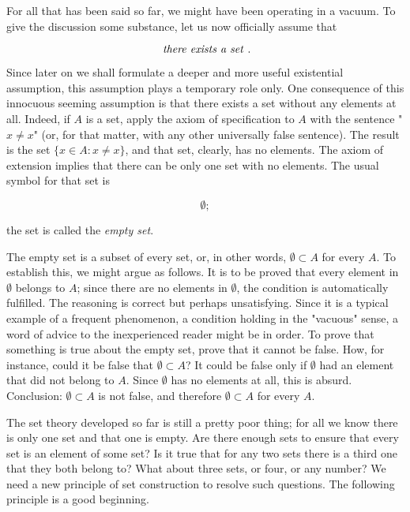 
For all that has been said so far, we might have been operating in a vacuum. To give the discussion some substance, let us now officially assume that

\begin{equation*}
\text{ \textit{there exists a set} }.
\end{equation*}
 
Since later on we shall formulate a deeper and more useful existential assumption, this  assumption  plays  a temporary role only. One consequence of this innocuous seeming assumption is that there exists a set without any elements at all. Indeed, if $A$ is a set, apply the axiom of specification to $A$ with the sentence "$ x \neq x $"  (or, for that matter, with any other universally false sentence). The result is the set $\{x \in A: x \neq x\}$, and that set, clearly, has no elements. The axiom of extension implies that there can be only one set with no elements. The usual symbol for that set is 

\begin{equation*}
\emptyset ;
\end{equation*}


the set is called the \textit{empty set}. 

The empty set is a subset of every set, or, in other words, $\emptyset \subset A$ for every $A$. To establish this, we might argue as follows. It is to be proved that every element in $ \emptyset $ belongs to $A$; since there are no elements in $ \emptyset $, the condition is automatically fulfilled. The reasoning is correct but perhaps unsatisfying. Since it is a typical example of a frequent phenomenon, a condition holding in the "vacuous" sense, a word of advice to the inexperienced reader might be in order. To prove that something is true about the empty set, prove that it cannot be false. How, for instance, could it be false that $ \emptyset \subset A$? It could be false only if $ \emptyset $ had an element that did not belong to $A$. Since $ \emptyset $ has no elements at all, this is absurd. Conclusion: $ \emptyset \subset A$ is not false, and therefore $ \emptyset \subset A$ for every $A$.

The set theory developed so far is still a pretty poor thing; for all we know there is only one set and that one is empty. Are there enough sets to ensure that every set is an element of some set? Is it true that for any two sets there is a third one that they both belong to? What about three sets, or four, or any number? We need a new principle of set construction to resolve such questions. The following principle is a good beginning. 

